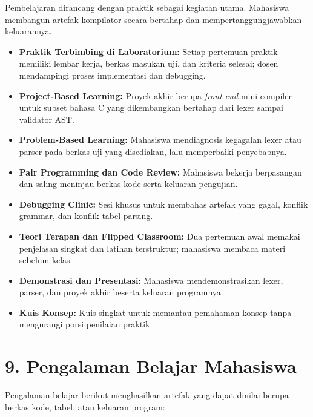 \documentclass[12pt,a4paper]{article}
\begin{document}
Pembelajaran dirancang dengan praktik sebagai kegiatan utama. Mahasiswa membangun artefak kompilator secara bertahap dan mempertanggungjawabkan keluarannya.

\begin{itemize}[leftmargin=*]
  \item \textbf{Praktik Terbimbing di Laboratorium:} Setiap pertemuan praktik memiliki lembar kerja, berkas masukan uji, dan kriteria selesai; dosen mendampingi proses implementasi dan debugging.
  \item \textbf{Project-Based Learning:} Proyek akhir berupa \textit{front-end} mini-compiler untuk subset bahasa C yang dikembangkan bertahap dari lexer sampai validator AST.
  \item \textbf{Problem-Based Learning:} Mahasiswa mendiagnosis kegagalan lexer atau parser pada berkas uji yang disediakan, lalu memperbaiki penyebabnya.
  \item \textbf{Pair Programming dan Code Review:} Mahasiswa bekerja berpasangan dan saling meninjau berkas kode serta keluaran pengujian.
  \item \textbf{Debugging Clinic:} Sesi khusus untuk membahas artefak yang gagal, konflik grammar, dan konflik tabel parsing.
  \item \textbf{Teori Terapan dan Flipped Classroom:} Dua pertemuan awal memakai penjelasan singkat dan latihan terstruktur; mahasiswa membaca materi sebelum kelas.
  \item \textbf{Demonstrasi dan Presentasi:} Mahasiswa mendemonstrasikan lexer, parser, dan proyek akhir beserta keluaran programnya.
  \item \textbf{Kuis Konsep:} Kuis singkat untuk memantau pemahaman konsep tanpa mengurangi porsi penilaian praktik.
\end{itemize}

\vspace{0.5cm}

\section*{9. Pengalaman Belajar Mahasiswa}

Pengalaman belajar berikut menghasilkan artefak yang dapat dinilai berupa berkas kode, tabel, atau keluaran program:
\end{document}
